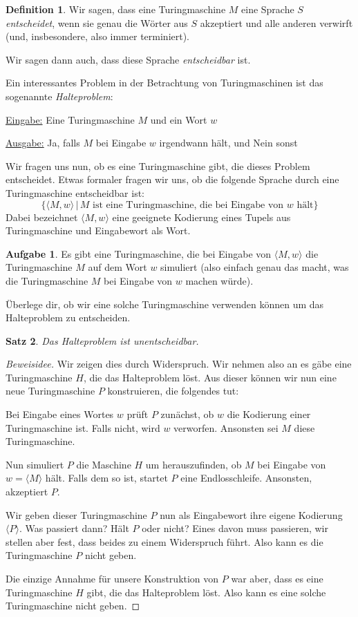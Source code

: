 \documentclass[a4paper,ngerman,12pt]{scrartcl}
\theoremstyle{definition}
\newtheorem{defn}{Definition}[]
\newtheorem{aufg}{Aufgabe}
\theoremstyle{plain}
\newtheorem{satz}[defn]{Satz}
\theoremstyle{remark}
\begin{document}
\begin{defn}
	Wir sagen, dass eine Turingmaschine $M$ eine Sprache $S$ \emph{entscheidet}, wenn sie genau die Wörter aus $S$ akzeptiert und alle anderen verwirft (und, insbesondere, also immer terminiert).
	
	Wir sagen dann auch, dass diese Sprache \emph{entscheidbar} ist.
\end{defn}

Ein interessantes Problem in der Betrachtung von Turingmaschinen ist das sogenannte \emph{Halteproblem}:

\underline{Eingabe:} Eine Turingmaschine $M$ und ein Wort $w$

\underline{Ausgabe:} Ja, falls $M$ bei Eingabe $w$ irgendwann hält, und Nein sonst

Wir fragen uns nun, ob es eine Turingmaschine gibt, die dieses Problem entscheidet. Etwas formaler fragen wir uns, ob die folgende Sprache durch eine Turingmaschine entscheidbar ist:
	\[\{\langle M, w\rangle \,|\, M \text{ ist eine Turingmaschine, die bei Eingabe von } w \text{ hält}\}\]
Dabei bezeichnet $\langle M, w\rangle$ eine geeignete Kodierung eines Tupels aus Turingmaschine und Eingabewort als Wort.

\begin{aufg}
	Es gibt eine Turingmaschine, die bei Eingabe von $\langle M, w\rangle$ die Turingmaschine $M$ auf dem Wort $w$ simuliert (also einfach genau das macht, was die Turingmaschine $M$ bei Eingabe von $w$ machen würde).
	
	Überlege dir, ob wir eine solche Turingmaschine verwenden können um das Halteproblem zu entscheiden.
\end{aufg}

\begin{satz}
	Das Halteproblem ist unentscheidbar.
\end{satz}

\begin{proof}[Beweisidee]
	Wir zeigen dies durch Widerspruch. Wir nehmen also an es gäbe eine Turingmaschine $H$, die das Halteproblem löst. Aus dieser können wir nun eine neue Turingmaschine $P$ konstruieren, die folgendes tut:
	
	Bei Eingabe eines Wortes $w$ prüft $P$ zunächst, ob $w$ die Kodierung einer Turingmaschine ist. Falls nicht, wird $w$ verworfen. Ansonsten sei $M$ diese Turingmaschine.
	
	Nun simuliert $P$ die Maschine $H$ um herauszufinden, ob $M$ bei Eingabe von $w = \langle M\rangle$ hält. Falls dem so ist, startet $P$ eine Endlosschleife. Ansonsten, akzeptiert $P$.
	
	Wir geben dieser Turingmaschine $P$ nun als Eingabewort ihre eigene Kodierung $\langle P\rangle$. Was passiert dann? Hält $P$ oder nicht? Eines davon muss passieren, wir stellen aber fest, dass beides zu einem Widerspruch führt. Also kann es die Turingmaschine $P$ nicht geben.
	
	Die einzige Annahme für unsere Konstruktion von $P$ war aber, dass es eine Turingmaschine $H$ gibt, die das Halteproblem löst. Also kann es eine solche Turingmaschine nicht geben.
\end{proof}
\end{document}
